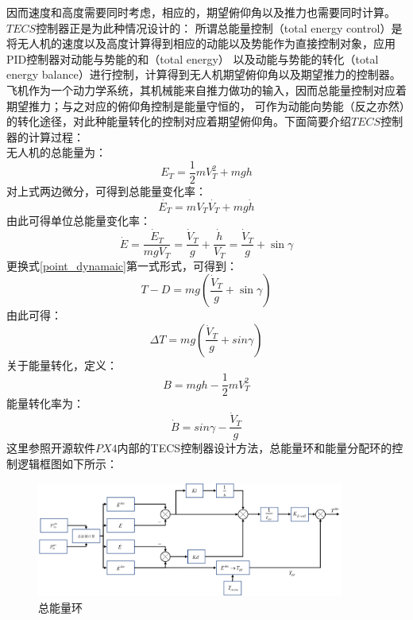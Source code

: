 因而速度和高度需要同时考虑，相应的，期望俯仰角以及推力也需要同时计算。$TECS$控制器正是为此种情况设计的：%
所谓总能量控制（total energy control）是将无人机的速度以及高度计算得到相应的动能以及势能作为直接控制对象，应用PID控制器对动能与势能的和（total energy）
以及动能与势能的转化（total energy balance）进行控制，计算得到无人机期望俯仰角以及期望推力的控制器。飞机作为一个动力学系统，其机械能来自推力做功的输入，因而总能量控制对应着期望推力；与之对应的俯仰角控制是能量守恒的，
可作为动能向势能（反之亦然）的转化途径，对此种能量转化的控制对应着期望俯仰角。下面简要介绍$TECS$控制器的计算过程：
\\
无人机的总能量为：
\begin{equation}
    E_T=\frac{1}{2}mV_T^2+mgh
    \label{ET}
\end{equation}
对上式两边微分，可得到总能量变化率：
\begin{equation}
    \dot{E_T}=mV_T\dot{V_T}+mg\dot{h}
    \label{ET_rate}
\end{equation}
由此可得单位总能量变化率：
\begin{equation}
    \dot{E}=\frac{\dot{E}_{T}}{m g V_{T}}=\frac{\dot{V}_{T}}{g}+\frac{\dot{h}}{V_{T}}=\frac{\dot{V}_{T}}{g}+\sin \gamma
    \label{specif_ET_rate}
\end{equation}
更换式\ref{point_dynamaic}第一式形式，可得到：
\begin{equation}
    T-D=m g\left(\frac{\dot{V}_{T}}{g}+\sin \gamma\right)
    \label{point_dynamaic_change}
\end{equation}
由此可得：
\begin{equation}
    \Delta T=m g\left(\frac{\dot{V}_{T}}{g}+sin\gamma\right)
    \label{thrust}
\end{equation}
关于能量转化，定义：
\begin{equation}
    B=m g h-\frac{1}{2} m V_{T}^{2}
\end{equation}
能量转化率为：
\begin{equation}
\dot{B}=sin\gamma-\frac{\dot{V}_{T}}{g}
\end{equation}
这里参照开源软件$PX4$内部的TECS控制器设计方法，总能量环和能量分配环的控制逻辑框图如下所示：
\begin{figure}[H]
    \centering
    \includegraphics[width=0.9\textwidth]{figures/c3/TECS_throttle.jpg}
    \caption{总能量环}\label{fig:total_energy}
\end{figure}
